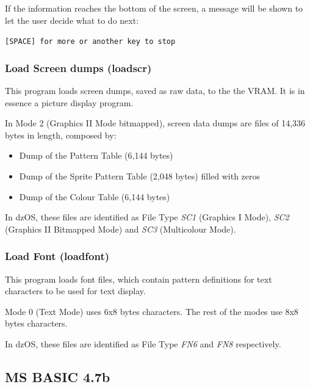 \documentclass[a4paper,11pt]{article}
\begin{document}
    If the information reaches the bottom of the screen, a message will be shown
    to let the user decide what to do next:

    \hspace{1cm}\texttt{[SPACE] for more or another key to stop}

    \subsubsection{Load Screen dumps (loadscr)}
    This program loads screen dumps, saved as raw data, to the the VRAM. It is
    in essence a picture display program.

    In Mode 2 (Graphics II Mode bitmapped), screen data dumps are files of
    14,336 bytes in length, composed by:
    \begin{itemize}
        \item Dump of the Pattern Table (6,144 bytes)
        \item Dump of the Sprite Pattern Table (2,048 bytes) filled with zeros
        \item Dump of the Colour Table (6,144 bytes)
    \end{itemize}

    In dzOS, these files are identified as File Type \textit{SC1}
    (Graphics I Mode), \textit{SC2} (Graphics II Bitmapped Mode) and
    \textit{SC3} (Multicolour Mode).

    \subsubsection{Load Font (loadfont)}
    This program loads font files, which contain pattern definitions for text
    characters to be used for text display.

    Mode 0 (Text Mode) uses 6x8 bytes characters. The rest of the modes use 8x8
    bytes characters.
    
    In dzOS, these files are identified as File Type \textit{FN6} and
    \textit{FN8} respectively.

    \subsection{MS BASIC 4.7b}
    
\end{document}
